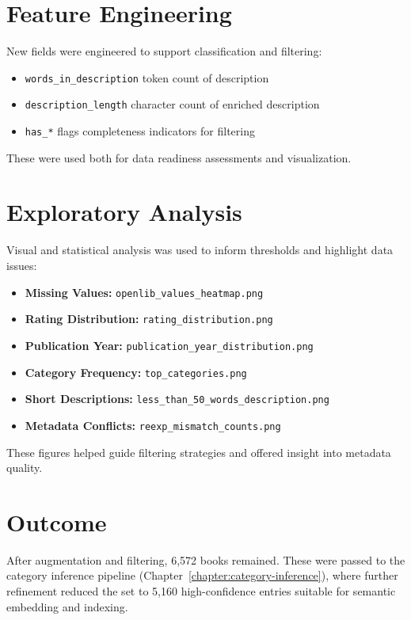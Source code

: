 \section{Feature Engineering}
New fields were engineered to support classification and filtering:
\begin{itemize}
\item \verb|words_in_description| \textemdash{} token count of description
\item \verb|description_length| \textemdash{} character count of enriched description
\item \verb|has_*| flags \textemdash{} completeness indicators for filtering
\end{itemize}
These were used both for data readiness assessments and visualization.

\section{Exploratory Analysis}
Visual and statistical analysis was used to inform thresholds and highlight data issues:
\begin{itemize}
\item \textbf{Missing Values:} \verb|openlib_values_heatmap.png|
\item \textbf{Rating Distribution:} \verb|rating_distribution.png|
\item \textbf{Publication Year:} \verb|publication_year_distribution.png|
\item \textbf{Category Frequency:} \verb|top_categories.png|
\item \textbf{Short Descriptions:} \verb|less_than_50_words_description.png|
\item \textbf{Metadata Conflicts:} \verb|reexp_mismatch_counts.png|
\end{itemize}
These figures helped guide filtering strategies and offered insight into metadata quality.

\section{Outcome}
After augmentation and filtering, 6,572 books remained. These were passed to the category inference pipeline (Chapter~\ref{chapter:category-inference}), where further refinement reduced the set to 5,160 high-confidence entries suitable for semantic embedding and indexing.